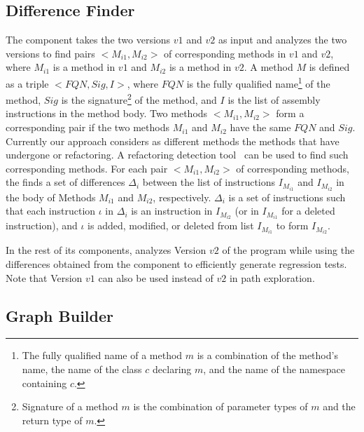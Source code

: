 \subsection{Difference Finder}
The  component takes the two versions $v1$ and $v2$ as input and analyzes the two versions to find pairs $<M_{i1}, M_{i2}>$ of corresponding methods in $v1$ and $v2$, where $M_{i1}$ is a method in $v1$ and $M_{i2}$ is a method in $v2$. A method $M$ is defined as a triple $<FQN, Sig, I>$, where $FQN$ is the fully qualified name\footnote{The fully qualified name of a method $m$ is a combination of the method's name, the name of the class $c$ declaring $m$, and the name of the namespace containing $c$.} of the method, $Sig$ is the signature\footnote{Signature of a method $m$ is the combination of parameter types of $m$ and the return type of $m$.} of the method, and $I$ is the list of assembly instructions in the method body. Two methods $<M_{i1}, M_{i2}>$ form a  corresponding pair if the two methods $M_{i1}$ and $M_{i2}$ have the same $FQN$ and $Sig$. Currently our approach considers as different methods the methods that have undergone  or  refactoring. A refactoring detection tool~\cite{Dig'06:ECOOP} can be used to find such corresponding methods. For each pair $<M_{i1}, M_{i2}>$ of corresponding methods, the  finds a set of  differences $\Delta_i$ between the list of instructions $I_{M_{i1}}$ and $I_{M_{i2}}$ in the body of Methods $M_{i1}$ and $M_{i2}$, respectively. $\Delta_i$ is a set of instructions such that each instruction $\iota$ in $\Delta_i$ is an instruction in $I_{M_{i2}}$ (or in $I_{M_{i1}}$ for a deleted instruction), and $\iota$ is added, modified, or deleted from list $I_{M_{i1}}$ to form $I_{M_{i2}}$.

In the rest of its components,  analyzes Version $v2$ of the program while using the differences obtained from the  component to efficiently generate regression tests. Note that Version $v1$ can also be used instead of $v2$ in path exploration.

\subsection{Graph Builder}
   
